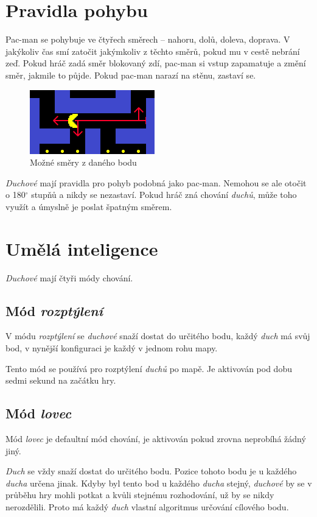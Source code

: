\documentclass[czech]{pyt-report}
\begin{document}
\section{Pravidla pohybu}
Pac-man se pohybuje ve čtyřech směrech – nahoru, dolů, doleva, doprava. V jakýkoliv čas smí zatočit jakýmkoliv z těchto směrů, pokud mu v cestě nebrání zeď. Pokud hráč zadá směr blokovaný zdí, pac-man si vstup zapamatuje a změní směr, jakmile to půjde. Pokud pac-man narazí na stěnu, zastaví se.\par
\begin{figure}[h]
  \centering\leavevmode
  \includegraphics[width=.45\linewidth]{img/pac-man_directions.png}\vskip-0.5cm
  \caption{Možné směry z daného bodu}
  \label{fig:par-y}
\end{figure}
\textit{Duchové} mají pravidla pro pohyb podobná jako pac-man. Nemohou se ale otočit o 180$^{\circ}$  stupňů a nikdy se nezastaví. Pokud hráč zná chování \textit{duchů}, může toho využít a úmyslně je poslat špatným směrem.


\section{Umělá inteligence}
\textit{Duchové} mají čtyři módy chování.
\subsection{Mód \textit{rozptýlení}}
V módu \textit{rozptýlení} se \textit{duchové} snaží dostat do určitého bodu, každý \textit{duch} má svůj bod, v nynější konfiguraci je každý v jednom rohu mapy.\par Tento mód se používá pro rozptýlení \textit{duchů} po mapě. Je aktivován pod dobu sedmi sekund na začátku hry.
\subsection{Mód \textit{lovec}}
Mód \textit{lovec} je defaultní mód chování, je aktivován pokud zrovna neprobíhá žádný jiný.\par
\textit{Duch} se vždy snaží dostat do určitého bodu. Pozice tohoto bodu je u každého \textit{ducha} určena jinak. Kdyby byl tento bod u každého \textit{ducha} stejný, \textit{duchové} by se v průběhu hry mohli potkat a kvůli stejnému rozhodování, už by se nikdy nerozdělili. Proto má každý \textit{duch} vlastní algoritmus určování cílového bodu.
\end{document}
